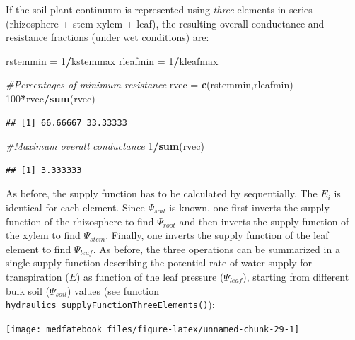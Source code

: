 \documentclass[]{book}
\newenvironment{Shaded}{\begin{snugshade}}{\end{snugshade}}
\newcommand{\KeywordTok}[1]{\textcolor[rgb]{0.13,0.29,0.53}{\textbf{#1}}}
\newcommand{\DecValTok}[1]{\textcolor[rgb]{0.00,0.00,0.81}{#1}}
\newcommand{\StringTok}[1]{\textcolor[rgb]{0.31,0.60,0.02}{#1}}
\newcommand{\CommentTok}[1]{\textcolor[rgb]{0.56,0.35,0.01}{\textit{#1}}}
\newcommand{\OperatorTok}[1]{\textcolor[rgb]{0.81,0.36,0.00}{\textbf{#1}}}
\newcommand{\NormalTok}[1]{#1}
\begin{document}
If the soil-plant continuum is represented using \emph{three} elements in series (rhizosphere + stem xylem + leaf), the resulting overall conductance and resistance fractions (under wet conditions) are:

\begin{Shaded}
\begin{Highlighting}[]
\NormalTok{rstemmin =}\StringTok{ }\DecValTok{1}\OperatorTok{/}\NormalTok{kstemmax}
\NormalTok{rleafmin =}\StringTok{ }\DecValTok{1}\OperatorTok{/}\NormalTok{kleafmax}

\CommentTok{#Percentages of minimum resistance}
\NormalTok{rvec =}\StringTok{ }\KeywordTok{c}\NormalTok{(rstemmin,rleafmin)}
\DecValTok{100}\OperatorTok{*}\NormalTok{rvec}\OperatorTok{/}\KeywordTok{sum}\NormalTok{(rvec)}
\end{Highlighting}
\end{Shaded}

\begin{verbatim}
## [1] 66.66667 33.33333
\end{verbatim}

\begin{Shaded}
\begin{Highlighting}[]
\CommentTok{#Maximum overall conductance}
\DecValTok{1}\OperatorTok{/}\KeywordTok{sum}\NormalTok{(rvec)}
\end{Highlighting}
\end{Shaded}

\begin{verbatim}
## [1] 3.333333
\end{verbatim}

As before, the supply function has to be calculated by sequentially. The \(E_i\) is identical for each element. Since \(\Psi_{soil}\) is known, one first inverts the supply function of the rhizosphere to find \(\Psi_{root}\) and then inverts the supply function of the xylem to find \(\Psi_{stem}\). Finally, one inverts the supply function of the leaf element to find \(\Psi_{leaf}\). As before, the three operations can be summarized in a single supply function describing the potential rate of water supply for transpiration (\(E\)) as function of the leaf pressure (\(\Psi_{leaf}\)), starting from different bulk soil (\(\Psi_{soil}\)) values (see function \texttt{hydraulics\_supplyFunctionThreeElements()}):

\begin{center}\texttt{[image: medfatebook\_files/figure-latex/unnamed-chunk-29-1]} \end{center}
\end{document}
